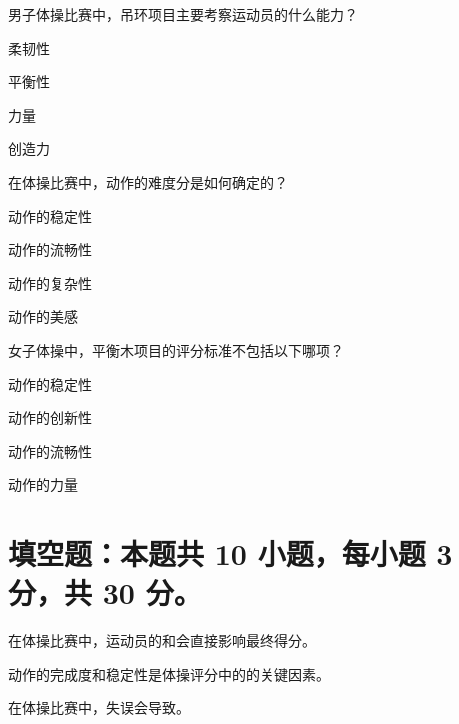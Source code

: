 \documentclass{exam-zh}
\begin{document}
    \begin{question}[points = 2]
    男子体操比赛中，吊环项目主要考察运动员的什么能力？
    \begin{choices}
    \item 柔韧性
    \item 平衡性
    \item 力量
    \item 创造力
    \end{choices}
    \end{question}
    
    \begin{question}[points = 2]
    在体操比赛中，动作的难度分是如何确定的？
    \begin{choices}
    \item 动作的稳定性
    \item 动作的流畅性
    \item 动作的复杂性
    \item 动作的美感
    \end{choices}
    \end{question}
    
    \begin{question}[points = 2]
    女子体操中，平衡木项目的评分标准不包括以下哪项？
    \begin{choices}
    \item 动作的稳定性
    \item 动作的创新性
    \item 动作的流畅性
    \item 动作的力量
    \end{choices}
    \end{question}


\section{填空题：本题共 10 小题，每小题 3 分，共 30 分。}


    
    \begin{question}
    在体操比赛中，运动员的\fillin[完成度]和\fillin[稳定性]会直接影响最终得分。
    \end{question}
    
    \begin{question}
    动作的完成度和稳定性是体操评分中的\fillin[执行分]的关键因素。
    \end{question}
    
    \begin{question}
    在体操比赛中，失误会导致\fillin[扣分]。
    \end{question}
    
\end{document}
